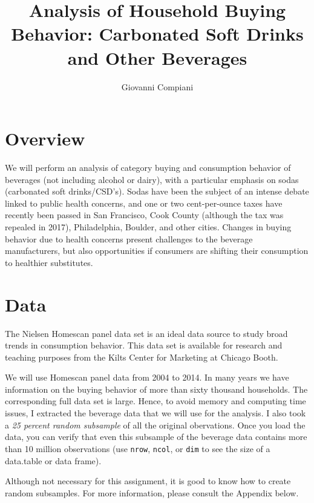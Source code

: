 \documentclass[
]{article}
\title{Analysis of Household Buying Behavior: Carbonated Soft Drinks and
Other Beverages}
\author{Giovanni Compiani}
\date{}
\begin{document}
\maketitle

{
\hypersetup{linkcolor=}
\setcounter{tocdepth}{2}
\tableofcontents
}
\setlength{\parskip}{6pt}
\newpage

\section{Overview}\label{overview}

We will perform an analysis of category buying and consumption behavior
of beverages (not including alcohol or dairy), with a particular
emphasis on sodas (carbonated soft drinks/CSD's). Sodas have been the
subject of an intense debate linked to public health concerns, and one
or two cent-per-ounce taxes have recently been passed in San Francisco,
Cook County (although the tax was repealed in 2017), Philadelphia,
Boulder, and other cities. Changes in buying behavior due to health
concerns present challenges to the beverage manufacturers, but also
opportunities if consumers are shifting their consumption to healthier
substitutes.

\section{Data}\label{data}

The Nielsen Homescan panel data set is an ideal data source to study
broad trends in consumption behavior. This data set is available for
research and teaching purposes from the Kilts Center for Marketing at
Chicago Booth.

We will use Homescan panel data from 2004 to 2014. In many years we have
information on the buying behavior of more than sixty thousand
households. The corresponding full data set is large. Hence, to avoid
memory and computing time issues, I extracted the beverage data that we
will use for the analysis. I also took a \emph{25 percent random
subsample} of all the original obervations. Once you load the data, you
can verify that even this subsample of the beverage data contains more
than 10 million observations (use \texttt{nrow}, \texttt{ncol}, or
\texttt{dim} to see the size of a data.table or data frame).

Although not necessary for this assignment, it is good to know how to
create random subsamples. For more information, please consult the
Appendix below.
\end{document}
